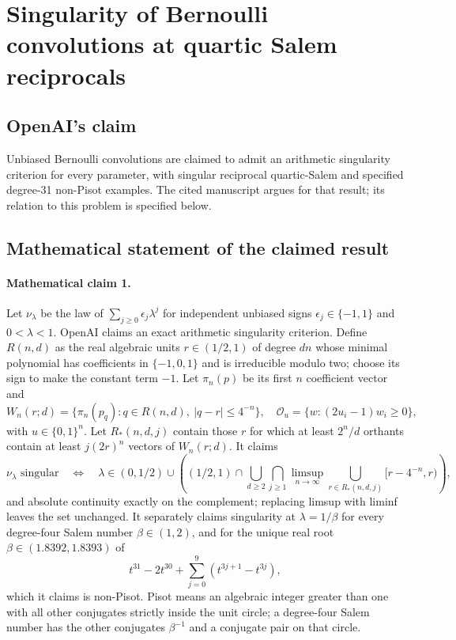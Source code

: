 \documentclass[11pt]{article}
\begin{document}
\section*{Singularity of Bernoulli convolutions at quartic Salem reciprocals}

\subsection{OpenAI's claim}
Unbiased Bernoulli convolutions are claimed to admit an arithmetic singularity criterion for every parameter, with singular reciprocal quartic-Salem and specified degree-31 non-Pisot examples. The cited manuscript argues for that result; its relation to this problem is specified below.

\subsection{Mathematical statement of the claimed result}
\paragraph{Mathematical claim 1.} Let $\nu_\lambda$ be the law of $\sum_{j\ge0}\epsilon_j\lambda^j$ for independent unbiased signs $\epsilon_j\in\{-1,1\}$ and $0<\lambda<1$. OpenAI claims an exact arithmetic singularity criterion. Define $R(n,d)$ as the real algebraic units $r\in(1/2,1)$ of degree $dn$ whose minimal polynomial has coefficients in $\{-1,0,1\}$ and is irreducible modulo two; choose its sign to make the constant term $-1$. Let $\pi_n(p)$ be its first $n$ coefficient vector and
\[
W_n(r;d)=\{\pi_n(p_q):q\in R(n,d),\ |q-r|\le4^{-n}\},\quad
\mathcal O_u=\{w:(2u_i-1)w_i\ge0\},
\]
with $u\in\{0,1\}^n$. Let $R_*(n,d,j)$ contain those $r$ for which at least $2^n/d$ orthants contain at least $j(2r)^n$ vectors of $W_n(r;d)$. It claims
\[
\nu_\lambda\text{ singular}\quad\Longleftrightarrow\quad
\lambda\in(0,1/2)\cup\left((1/2,1)\cap\bigcup_{d\ge2}\bigcap_{j\ge1}\limsup_{n\to\infty}\bigcup_{r\in R_*(n,d,j)}[r-4^{-n},r)\right),
\]
and absolute continuity exactly on the complement; replacing limsup with liminf leaves the set unchanged.
It separately claims singularity at $\lambda=1/\beta$ for every degree-four Salem number $\beta\in(1,2)$, and for the unique real root $\beta\in(1.8392,1.8393)$ of
\[
t^{31}-2t^{30}+\sum_{j=0}^9(t^{3j+1}-t^{3j}),
\]
which it claims is non-Pisot. Pisot means an algebraic integer greater than one with all other conjugates strictly inside the unit circle; a degree-four Salem number has the other conjugates $\beta^{-1}$ and a conjugate pair on that circle.
\end{document}

